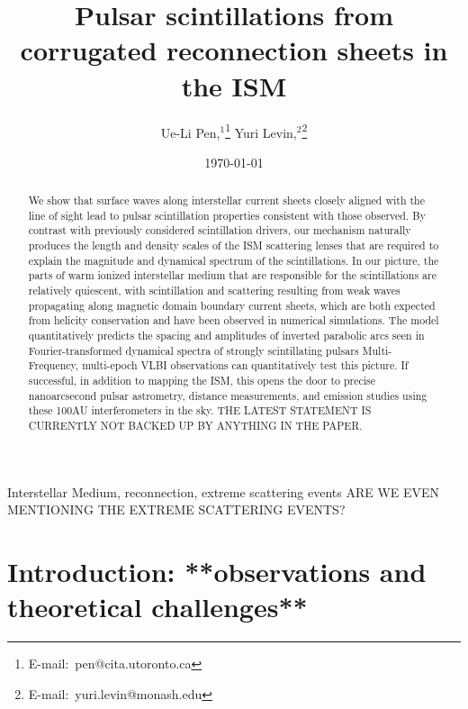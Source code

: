 \documentclass[useAMS,usenatbib]{mn2e}
\title[Interstellar Plasma Scattering]{
Pulsar scintillations from corrugated reconnection sheets in the ISM
}
\author[Pen and Levin]{Ue-Li
  Pen,$^{1}$\thanks{E-mail:\ pen@cita.utoronto.ca}
Yuri Levin,$^2$\thanks{E-mail:\ yuri.levin@monash.edu}
}
\begin{document}
\date{\today}

\pagerange{\pageref{firstpage}--\pageref{lastpage}} 

\maketitle
\label{firstpage}
\begin{abstract}

We show that surface waves along interstellar current sheets closely
aligned with the line of sight lead to pulsar scintillation properties
consistent with those observed.  By contrast with previously
considered scintillation drivers, our mechanism naturally produces the
length and density scales of the ISM scattering lenses that are
required to explain the magnitude and dynamical spectrum of the
scintillations.  In our picture, the parts of warm ionized
interstellar medium that are responsible for the scintillations are
relatively quiescent, with scintillation and scattering resulting from
weak waves propagating along magnetic domain boundary current sheets,
which are both expected from helicity conservation and have been
observed in numerical simulations.  The model quantitatively predicts
the spacing and amplitudes of inverted parabolic arcs seen in
Fourier-transformed dynamical spectra of strongly scintillating
pulsars Multi-Frequency, multi-epoch VLBI observations can
quantitatively test this picture.  If successful, in addition to
mapping the ISM, this opens the door to precise nanoarcsecond pulsar
astrometry, distance measurements, and emission studies using these
100AU interferometers in the sky. THE LATEST STATEMENT IS CURRENTLY
NOT BACKED UP BY ANYTHING IN THE PAPER.

\end{abstract}
\begin{keywords}
Interstellar Medium, reconnection, extreme scattering events ARE WE EVEN MENTIONING THE 
EXTREME SCATTERING EVENTS?
\end{keywords}

\newcommand{\be}{\begin{eqnarray}}
\newcommand{\ee}{\end{eqnarray}}
\newcommand{\beq}{\begin{equation}}
\newcommand{\eeq}{\end{equation}}

\section{Introduction: **observations and theoretical challenges**}
\end{document}
